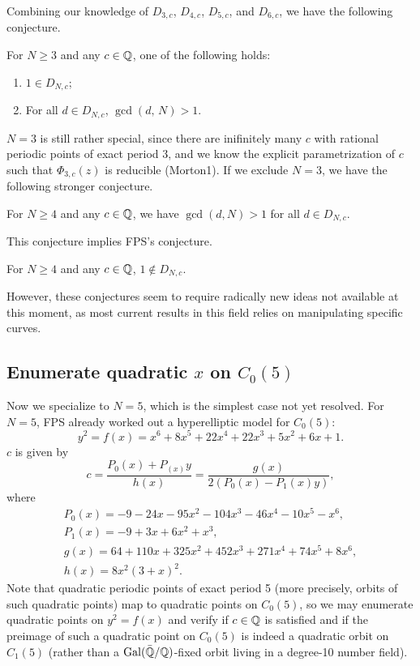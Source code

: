 Combining our knowledge of $D_{3,c}$, $D_{4,c}$, $D_{5,c}$, and
$D_{6,c}$, we have the following conjecture.

\begin{conjecture}
  For $N \ge 3$ and any $c \in \mathbb{Q}$, one of the following holds:
  \begin{enumerate}
  \item $1 \in D_{N,c}$;
  \item For all $d \in D_{N,c}$, $\gcd(d,\, N) > 1$.
  \end{enumerate}
\end{conjecture}

$N = 3$ is still rather special, since there are inifinitely many $c$
with rational periodic points of exact period 3, and we know the
explicit parametrization of $c$ such that $\Phi_{3,c}(z)$ is
reducible (Morton1). If we exclude $N = 3$, we have the following
stronger conjecture.

\begin{conjecture}
  For $N \ge 4$ and any $c \in \mathbb{Q}$, we have $\gcd(d, N) > 1$ for all
  $d \in D_{N,c}$.
\end{conjecture}

This conjecture implies FPS's conjecture.

\begin{conjecture}[FPS]
  For $N \ge 4$ and any $c \in \mathbb{Q}$, $1 \not\in D_{N,c}$.
\end{conjecture}

However, these conjectures seem to require radically new ideas not
available at this moment, as most current results in this field relies
on manipulating specific curves.

\subsection{Enumerate quadratic $x$ on $C_0(5)$}

Now we specialize to $N = 5$, which is the simplest case not yet
resolved. For $N = 5$, FPS already worked out a hyperelliptic model
for $C_0(5)$:
\[
y^2 = f(x) = x^6 + 8x^5 + 22x^4 + 22x^3 + 5x^2 + 6x + 1.
\]
$c$ is given by
\[
c = \frac{P_0(x) + P_(x) y}{h(x)} = \frac{g(x)}{2(P_0(x) - P_1(x) y)},
\]
where
\[
\begin{gathered}
  P_0(x) = - 9 - 24x - 95x^2 - 104x^3 - 46x^4 - 10x^5 - x^6,\\
  P_1(x) = - 9 + 3x + 6x^2 + x^3,\\
  g(x) = 64 + 110x + 325x^2 + 452x^3 + 271x^4 + 74x^5 + 8x^6,\\
  h(x) = 8x^2(3 + x)^2.
\end{gathered}
\]
Note that quadratic periodic points of exact period 5 (more precisely,
orbits of such quadratic points) map to quadratic points on $C_0(5)$,
so we may enumerate quadratic points on $y^2 = f(x)$ and verify if $c
\in \mathbb{Q}$ is satisfied and if the preimage of such a quadratic point on
$C_0(5)$ is indeed a quadratic orbit on $C_1(5)$ (rather than a
$\mathrm{Gal}(\bar{\mathbb{Q}}/\mathbb{Q})$-fixed orbit living in a degree-10 number field).

